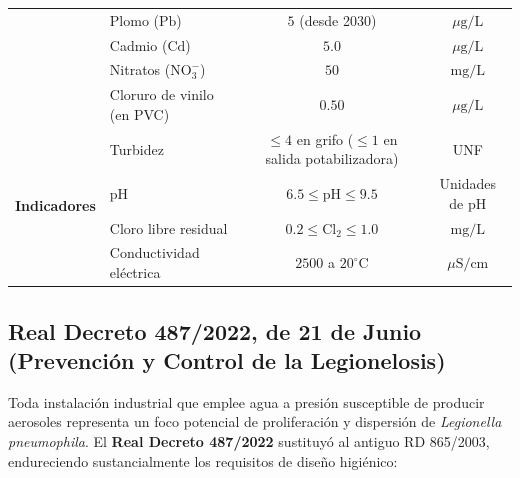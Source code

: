 \documentclass{report}
\begin{document}
\begin{enumerate}
\begin{table}[H]
\begin{tabularx}{\textwidth}{@{}lXcc@{}}
                  & Plomo ($\text{Pb}$) & $5$ (desde 2030) & $\mu\text{g/L}$ \\

                  & Cadmio ($\text{Cd}$) & $5.0$ & $\mu\text{g/L}$ \\

                  & Nitratos ($\text{NO}_3^-$) & $50$ & $\text{mg/L}$ \\

                  & Cloruro de vinilo (en PVC) & $0.50$ & $\mu\text{g/L}$ \\

                  \midrule

                  \multirow{4}{*}{\textbf{Indicadores}} 

                  & Turbidez & $\le 4$ en grifo ($\le 1$ en salida potabilizadora) & UNF \\

                  & pH & $6.5 \le \text{pH} \le 9.5$ & Unidades de pH \\

                  & Cloro libre residual & $0.2 \le \text{Cl}_2 \le 1.0$ & $\text{mg/L}$ \\

                  & Conductividad eléctrica & $2500$ a $20^\circ\text{C}$ & $\mu\text{S/cm}$ \\

                  \bottomrule

              \end{tabularx}

          \end{table}

\end{enumerate}



\subsection{Real Decreto 487/2022, de 21 de Junio (Prevención y Control de la Legionelosis)}

Toda instalación industrial que emplee agua a presión susceptible de producir aerosoles representa un foco potencial de proliferación y dispersión de \textit{Legionella pneumophila}. El \textbf{Real Decreto 487/2022} \cite{RD487_2022} sustituyó al antiguo RD 865/2003, endureciendo sustancialmente los requisitos de diseño higiénico:
\end{document}
